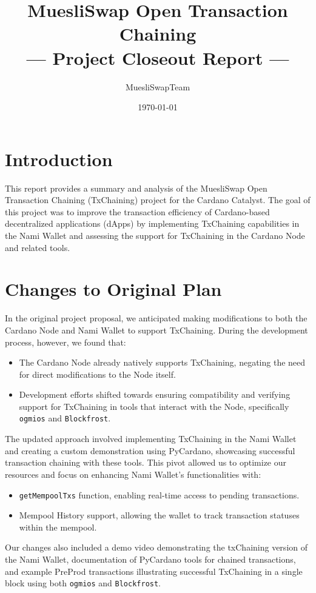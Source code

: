 \documentclass[11pt]{article}
\title{MuesliSwap Open Transaction Chaining \\--- Project Closeout Report ---}
\author{MuesliSwapTeam}
\date{\today}
\begin{document}
\maketitle

\section{Introduction}
This report provides a summary and analysis of the MuesliSwap Open Transaction Chaining (TxChaining) project for the Cardano Catalyst. The goal of this project was to improve the transaction efficiency of Cardano-based decentralized applications (dApps) by implementing TxChaining capabilities in the Nami Wallet and assessing the support for TxChaining in the Cardano Node and related tools.

\section{Changes to Original Plan}
In the original project proposal, we anticipated making modifications to both the Cardano Node and Nami Wallet to support TxChaining. During the development process, however, we found that:

\begin{itemize}
    \item The Cardano Node already natively supports TxChaining, negating the need for direct modifications to the Node itself.
    \item Development efforts shifted towards ensuring compatibility and verifying support for TxChaining in tools that interact with the Node, specifically \texttt{ogmios} and \texttt{Blockfrost}.
\end{itemize}

The updated approach involved implementing TxChaining in the Nami Wallet and creating a custom demonstration using PyCardano, showcasing successful transaction chaining with these tools. This pivot allowed us to optimize our resources and focus on enhancing Nami Wallet’s functionalities with:

\begin{itemize}
    \item \texttt{getMempoolTxs} function, enabling real-time access to pending transactions.
    \item Mempool History support, allowing the wallet to track transaction statuses within the mempool.
\end{itemize}

Our changes also included a demo video demonstrating the txChaining version of the Nami Wallet, documentation of PyCardano tools for chained transactions, and example PreProd transactions illustrating successful TxChaining in a single block using both \texttt{ogmios} and \texttt{Blockfrost}.
\end{document}
